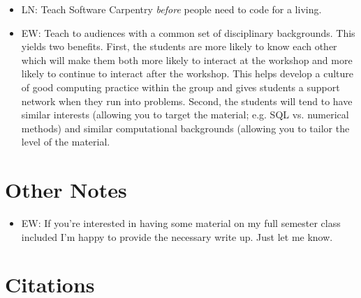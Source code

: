 \documentclass{article}
\begin{document}
\begin{itemize}
  \item LN: Teach Software Carpentry \emph{before} people need to code for a living.

  \item EW: Teach to audiences with a common set of disciplinary backgrounds. This yields two benefits. First, the students are more likely to know each other which will make them both more likely to interact at the workshop and more likely to continue to interact after the workshop. This helps develop a culture of good computing practice within the group and gives students a support network when they run into problems. Second, the students will tend to have similar interests (allowing you to target the material; e.g. SQL vs. numerical methods) and similar computational backgrounds (allowing you to tailor the level of the material.

\end{itemize}

\section{Other Notes}

\begin{itemize}

  \item EW: If you're interested in having some material on my full semester class included I'm happy to provide the necessary write up. Just let me know.

\end{itemize}

\section{Citations}

\cite{hannay2009}
\cite{prabhu2011}
\cite{wilson1996}
\cite{wilson2006a}
\cite{wilson2006b}
\cite{wilson2009}



\end{document}
